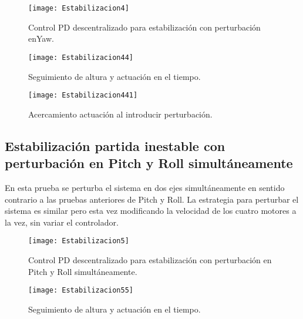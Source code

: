 \documentclass[../main.tex]{subfiles}
\begin{document}
\begin{figure}[H]
\noindent \begin{centering}
\texttt{[image: Estabilizacion4]}
\par\end{centering}
\caption{Control PD descentralizado para estabilización con perturbación enYaw.}
\end{figure}


\begin{figure}[H]
\noindent \begin{centering}
\texttt{[image: Estabilizacion44]}
\par\end{centering}
\caption{Seguimiento de altura y actuación en el tiempo.}
\end{figure}

\begin{figure}[H]
\noindent \begin{centering}
\texttt{[image: Estabilizacion441]}
\par\end{centering}
\caption{Acercamiento actuación al introducir perturbación.}
\end{figure}

\subsection{Estabilización partida inestable con perturbación en Pitch y Roll
simultáneamente}

En esta prueba se perturba el sistema en dos ejes simultáneamente
en sentido contrario a las pruebas anteriores de Pitch y Roll. La
estrategia para perturbar el sistema es similar pero esta vez modificando
la velocidad de los cuatro motores a la vez, sin variar el controlador.

\begin{figure}[H]
\noindent \begin{centering}
\texttt{[image: Estabilizacion5]}
\par\end{centering}
\caption{Control PD descentralizado para estabilización con perturbación en
Pitch y Roll simultáneamente.}
\end{figure}


\begin{figure}[H]
\noindent \begin{centering}
\texttt{[image: Estabilizacion55]}
\par\end{centering}
\caption{Seguimiento de altura y actuación en el tiempo.}
\end{figure}
\end{document}
